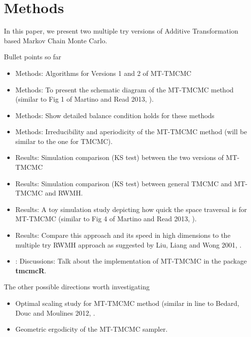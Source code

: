 \section{Methods}

In this paper, we present two multiple try versions of Additive Transformation based Markov Chain Monte Carlo. 

Bullet points so far 

\begin{itemize}
\item Methods: Algorithms for Versions 1 and 2 of MT-TMCMC
\item Methods: To present the schematic diagram of the MT-TMCMC method (similar to Fig 1 of Martino and Read 2013, \cite{Martino2013}).
\item  Methods: Show detailed balance condition holds for these methods
\item Methods: Irreducibility and aperiodicity of the MT-TMCMC method (will be similar to the one for TMCMC).
\item  Results: Simulation comparison (KS test) between the two versions of MT-TMCMC
\item  Results: Simulation comparison (KS test) between general TMCMC and MT-TMCMC and RWMH.
\item  Results: A toy simulation study depicting how quick the space traversal is for MT-TMCMC (similar to Fig 4 of Martino and 
Read 2013, \cite{Martino2013}).
\item Results: Compare this approach and its speed in high dimensions to the multiple try RWMH approach as suggested by 
Liu, Liang and Wong 2001, \cite{Liu2001}.
\item : Discussions: Talk about the implementation of MT-TMCMC in the package \textbf{tmcmcR}.
\end{itemize}


The other possible directions worth investigating 

\begin{itemize}
\item Optimal scaling study for MT-TMCMC method (similar in line to Bedard, Douc and Moulines 2012, \cite{Bedard2012}.
\item Geometric ergodicity of the MT-TMCMC sampler. 
\end{itemize}


